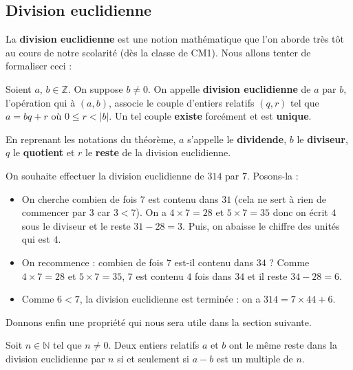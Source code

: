 	\subsection{Division euclidienne}

	La \textbf{division euclidienne} est une notion mathématique que l'on aborde très tôt au cours de notre scolarité (dès la classe de CM1). Nous allons tenter de formaliser ceci :

	\begin{formula}
		Soient $a$, $b \in \mathbb{Z}$. On suppose $b \neq 0$. On appelle \textbf{division euclidienne} de $a$ par $b$, l'opération qui à $(a, b)$, associe le couple d'entiers relatifs $(q, r)$ tel que $a = bq + r$ où $0 \leq r < |b|$. Un tel couple \textbf{existe} forcément et est \textbf{unique}.
	\end{formula}

	\begin{formula}[Vocabulaire]
		En reprenant les notations du théorème, $a$ s'appelle le \textbf{dividende}, $b$ le \textbf{diviseur}, $q$ le \textbf{quotient} et $r$ le \textbf{reste} de la division euclidienne.
	\end{formula}

	\begin{tip}[Exemple]
		On souhaite effectuer la division euclidienne de $314$ par $7$. Posons-la :
		\begin{itemize}
			\item On cherche combien de fois $7$ est contenu dans $31$ (cela ne sert à rien de commencer par $3$ car $3 < 7$). On a $4 \times 7 = 28$ et $5 \times 7 = 35$ donc on écrit $4$ sous le diviseur et le reste $31 - 28 = 3$. Puis, on abaisse le chiffre des unités qui est $4$.
			\item On recommence : combien de fois $7$ est-il contenu dans $34$ ? Comme $4 \times 7 = 28$ et $5 \times 7 = 35$, $7$ est contenu $4$ fois dans $34$ et il reste $34 - 28 = 6$.
			\item Comme $6 < 7$, la division euclidienne est terminée : on a $314 = 7 \times 44 + 6$.
		\end{itemize}
	\end{tip}

	Donnons enfin une propriété qui nous sera utile dans la section suivante.

	\begin{formula}[Propriété]
		Soit $n \in \mathbb{N}$ tel que $n \neq 0$. Deux entiers relatifs $a$ et $b$ ont le même reste dans la division euclidienne par $n$ si et seulement si $a-b$ est un multiple de $n$.
	\end{formula}

